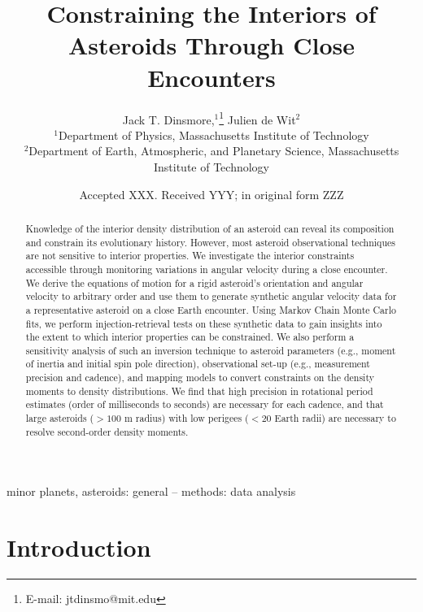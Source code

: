 \documentclass[fleqn,usenatbib]{mnras}
\title[Flyby Constraints on Asteroids Interiors]{Constraining the Interiors of Asteroids Through Close Encounters}
\author[Jack T. Dinsmore, Julien de Wit]{
Jack T. Dinsmore,$^{1}$\thanks{E-mail: jtdinsmo@mit.edu}
Julien de Wit$^{2}$
\\
$^{1}$Department of Physics, Massachusetts Institute of Technology\\
$^{2}$Department of Earth, Atmospheric, and Planetary Science, Massachusetts Institute of Technology
}
\date{Accepted XXX. Received YYY; in original form ZZZ}
\begin{document}
\label{firstpage}
\pagerange{\pageref{firstpage}--\pageref{lastpage}}
\maketitle

\begin{abstract}
  Knowledge of the interior density distribution of an asteroid can reveal its composition and constrain its evolutionary history. However, most asteroid observational techniques are not sensitive to interior properties. We investigate the interior constraints accessible through monitoring variations in angular velocity during a close encounter. We derive the equations of motion for a rigid asteroid's orientation and angular velocity to arbitrary order and use them to generate synthetic angular velocity data for a representative asteroid on a close Earth encounter. Using Markov Chain Monte Carlo fits, we perform injection-retrieval tests on these synthetic data to gain insights into the extent to which interior properties can be constrained. We also perform a sensitivity analysis of such an inversion technique to asteroid parameters (e.g., moment of inertia and initial spin pole direction), observational set-up (e.g., measurement precision and cadence), and mapping models to convert constraints on the density moments to density distributions. We find that high precision in rotational period estimates (order of milliseconds to seconds) are necessary for each cadence, and that large asteroids ($> 100$ m radius) with low perigees ($<20$ Earth radii) are necessary to resolve second-order density moments.
\end{abstract}

\begin{keywords}
  minor planets, asteroids: general -- methods: data analysis
\end{keywords}



\section{Introduction}
\end{document}
